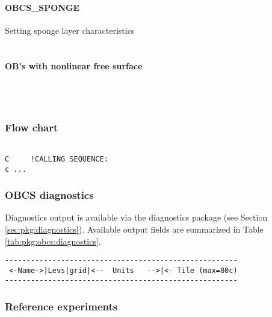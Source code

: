 \paragraph{OBCS\_SPONGE} Setting sponge layer characteristics \\
%
~

\paragraph{OB's with nonlinear free surface} ~ \\
%
~



\subsubsection{Flow chart
\label{sec:pkg:obcs:flowchart}}


{\footnotesize
\begin{verbatim}

C     !CALLING SEQUENCE:
c ...

\end{verbatim}
}


\subsubsection{OBCS diagnostics
\label{sec:pkg:obcs:diagnostics}}

Diagnostics output is available via the diagnostics package
(see Section \ref{sec:pkg:diagnostics}).
Available output fields are summarized in 
Table \ref{tab:pkg:obcs:diagnostics}.

\begin{table}[!ht]
\centering
\label{tab:pkg:obcs:diagnostics}
{\footnotesize
\begin{verbatim}
------------------------------------------------------
 <-Name->|Levs|grid|<--  Units   -->|<- Tile (max=80c)
------------------------------------------------------

\end{verbatim}
}
\caption{~}
\end{table}


\subsubsection{Reference experiments}



